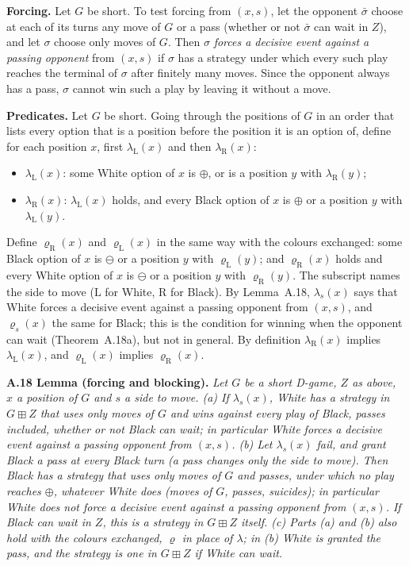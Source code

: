 \textbf{Forcing.} Let $G$ be short. To test forcing from $(x,s)$, let the opponent $\bar\sigma$ choose at each of its
turns any move of $G$ or a pass (whether or not $\bar\sigma$ can wait in $Z$), and let $\sigma$ choose only moves of $G$.
Then $\sigma$ \emph{forces a decisive event against a passing opponent} from $(x,s)$ if $\sigma$ has a strategy under
which every such play reaches the terminal of $\sigma$ after finitely many moves. Since the opponent always has a pass,
$\sigma$ cannot win such a play by leaving it without a move.

\textbf{Predicates.} Let $G$ be short. Going through the positions of $G$ in an order that lists every option that is a
position before the position it is an option of, define for each position $x$,
first $\lambda_{\mathrm L}(x)$ and then $\lambda_{\mathrm R}(x)$:
\begin{itemize}
\item[] $\lambda_{\mathrm L}(x)$: some White option of $x$ is $\oplus$, or is a position $y$ with $\lambda_{\mathrm R}(y)$;
\item[] $\lambda_{\mathrm R}(x)$: $\lambda_{\mathrm L}(x)$ holds, and every Black option of $x$ is $\oplus$ or a
position $y$ with $\lambda_{\mathrm L}(y)$.
\end{itemize}
Define $\varrho_{\mathrm R}(x)$ and $\varrho_{\mathrm L}(x)$ in the same way with the colours exchanged: some Black option
of $x$ is $\ominus$ or a position $y$ with $\varrho_{\mathrm L}(y)$; and $\varrho_{\mathrm R}(x)$ holds and every White
option of $x$ is $\ominus$ or a position $y$ with $\varrho_{\mathrm R}(y)$. The subscript names the side to move
($\mathrm L$ for White, $\mathrm R$ for Black). By Lemma~A.18, $\lambda_s(x)$ says that White forces a decisive event
against a passing opponent from $(x,s)$, and $\varrho_s(x)$ the same for Black; this is the condition for winning when the
opponent can wait (Theorem~A.18a), but not in general. By definition $\lambda_{\mathrm R}(x)$ implies
$\lambda_{\mathrm L}(x)$, and $\varrho_{\mathrm L}(x)$ implies $\varrho_{\mathrm R}(x)$.

\textbf{A.18 Lemma (forcing and blocking).} \emph{Let $G$ be a short D-game, $Z$ as above, $x$ a position of $G$ and $s$
a side to move. (a) If $\lambda_s(x)$, White has a strategy in $G\boxplus Z$ that uses only moves of $G$ and wins
against every play of Black, passes included, whether or not Black can wait; in particular White forces a decisive
event against a passing opponent from $(x,s)$. (b) Let $\lambda_s(x)$ fail, and grant Black a pass at every Black turn
(a pass changes only the side to move). Then Black has a strategy that uses only moves of $G$ and passes, under which no
play reaches $\oplus$, whatever White does (moves of $G$, passes, suicides); in particular White does not force a
decisive event against a passing opponent from $(x,s)$. If Black can wait in $Z$, this is a strategy in $G\boxplus Z$
itself. (c) Parts (a) and (b) also hold with the colours exchanged, $\varrho$ in place of $\lambda$; in (b) White is
granted the pass, and the strategy is one in $G\boxplus Z$ if White can wait.}

